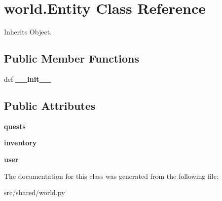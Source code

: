 \hypertarget{classworld_1_1_entity}{\section{world.\-Entity \-Class \-Reference}
\label{classworld_1_1_entity}
}


\-Inherits \-Object.

\subsection*{\-Public \-Member \-Functions}
\begin{DoxyCompactItemize}
\item 
\hypertarget{classworld_1_1_entity_ae3f6c9349b4756df29e482ae07582ca4}{def {\bfseries \-\_\-\-\_\-init\-\_\-\-\_\-}}\label{classworld_1_1_entity_ae3f6c9349b4756df29e482ae07582ca4}

\end{DoxyCompactItemize}
\subsection*{\-Public \-Attributes}
\begin{DoxyCompactItemize}
\item 
\hypertarget{classworld_1_1_entity_a02ac854a6a124cc8bfdef46ae7941434}{{\bfseries quests}}\label{classworld_1_1_entity_a02ac854a6a124cc8bfdef46ae7941434}

\item 
\hypertarget{classworld_1_1_entity_add2bc9bb2f731cc86228d8932a962e60}{{\bfseries inventory}}\label{classworld_1_1_entity_add2bc9bb2f731cc86228d8932a962e60}

\item 
\hypertarget{classworld_1_1_entity_a2e893d9acd136fa158874582882a3f13}{{\bfseries user}}\label{classworld_1_1_entity_a2e893d9acd136fa158874582882a3f13}

\end{DoxyCompactItemize}


\-The documentation for this class was generated from the following file\-:\begin{DoxyCompactItemize}
\item 
src/shared/world.\-py\end{DoxyCompactItemize}
